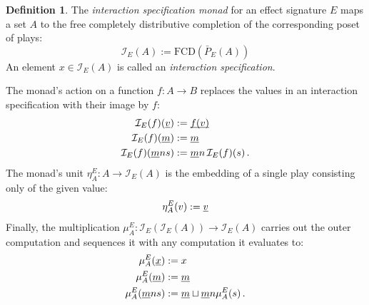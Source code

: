 \documentclass[11pt,oneside]{book}
\theoremstyle{definition}
\newtheorem{definition}[theorem]{Definition}
\newcommand{\ul}[1]{%
  \underline{\smash{#1}}
}
\begin{document}
\begin{definition} \label{def:intm} %
The \emph{interaction specification monad}
for an effect signature $E$
maps a set $A$
to the free completely distributive completion
of the corresponding poset of plays:
\[
    \mathcal{I}_E(A) :=
      \mathrm{FCD}(\bar{P}_E(A))
\]
An element $x \in \mathcal{I}_E(A)$ is called
an \emph{interaction specification}.

The monad's action on a function $f : A \rightarrow B$
replaces the values in
an interaction specification with their image by $f$:
\begin{align*}
  \mathcal{I}_E(f)(\ul{v}) &:= \ul{f(v)} \\
  \mathcal{I}_E(f)(\ul{m}) &:= \ul{m} \\
  \mathcal{I}_E(f)(\ul{m} n s) &:=
    \ul{m} n \, \mathcal{I}_E(f)(s) \,.
\end{align*}
The monad's unit
$\eta^E_A : A \rightarrow \mathcal{I}_E(A)$
is the embedding of a single play
consisting only of the given value:
\[
    \eta^E_A(v) := \ul{v}
\]
Finally, the multiplication
$\mu^E_A : \mathcal{I}_E(\mathcal{I}_E(A)) \rightarrow \mathcal{I}_E(A)$
carries out the outer computation and
sequences it with any computation it evaluates to:
\begin{align*}
  \mu^E_A(\ul{x}) &:= x \\
  \mu^E_A(\ul{m}) &:= \ul{m} \\
  \mu^E_A(\ul{m} n s) &:=
    \ul{m} \sqcup \ul{m} n \mu^E_A(s) \,.
\end{align*}
\end{definition}

%
\end{document}
